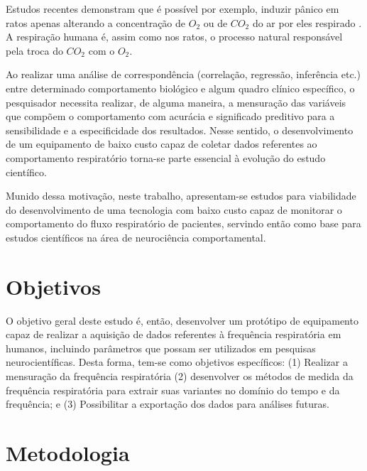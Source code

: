    Estudos recentes demonstram que é possível por exemplo, induzir pânico em ratos apenas alterando a concentração de $O_2$ ou de $CO_2$ do ar por eles respirado \cite{spiacci2015serotonin} \cite{spiacci2018panic}. A respiração humana é, assim como nos ratos, o processo natural responsável pela troca do $CO_2$ com o $O_2$.    
    
   Ao realizar uma análise de correspondência (correlação, regressão, inferência etc.) entre determinado comportamento biológico e algum quadro clínico específico, o 		pesquisador necessita realizar, de alguma maneira, a mensuração das variáveis que compõem o comportamento com acurácia e significado preditivo para a sensibilidade e a especificidade dos resultados. Nesse sentido, o desenvolvimento de um equipamento de baixo custo capaz de coletar dados referentes ao comportamento respiratório torna-se parte essencial à evolução do estudo científico. 
      
   Munido dessa motivação, neste trabalho, apresentam-se estudos para viabilidade do desenvolvimento de uma tecnologia com baixo custo capaz de monitorar o comportamento do fluxo respiratório de pacientes, servindo então como base para estudos científicos na área de neurociência comportamental. 
 
  \section{Objetivos}
  
	O objetivo geral deste estudo é, então, desenvolver um protótipo de equipamento capaz de realizar a aquisição de dados referentes à frequência respiratória em humanos, incluindo parâmetros que possam ser utilizados em pesquisas neurocientíficas. Desta forma, tem-se como objetivos específicos: (1) Realizar a mensuração da frequência respiratória (2) desenvolver os métodos de medida da frequência respiratória para extrair suas variantes no domínio do tempo e da frequência; e (3) Possibilitar a exportação dos dados para análises futuras.
  
  
  \section{Metodologia}

